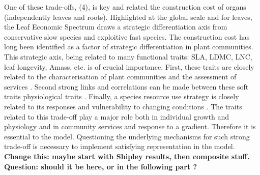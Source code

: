 One of these trade-offs, (4), is key and related the construction cost of organs (independently leaves and roots). Highlighted at the global scale and for leaves, the Leaf Economic Spectrum \cite{wright_worldwide_2004} draws a strategic differentiation axis from conservative slow species and exploitive fast species. The construction cost has long been identified as a factor of strategic differentiation in plant communities\cite{westoby_leaf-height-seed_1998}. This strategic axis, being related to many functional traits: SLA, LDMC, LNC, leaf longevity, Amass, etc.\cite{wright_worldwide_2004} is of crucial importance. First, these traits are closely related to the characterisation of plant communities and the assessment of services \cite{grime_benefits_1998}. Second strong links and correlations can be made between these soft traits physiological traits \cite{craine_functional_2002, reich_variation_2003, wright_worlwide_2004}. Finally, a species resource use strategy is closely related to its responses and vulnerability to changing conditions \cite{poorter_causes_2009, dwyer_specific_2014, deleglise_drought-induced_2015}. The traits related to this trade-off play a major role both in individual growth and physiology and in community services and response to a gradient. Therefore it is essential to the model. Questioning the underlying mechanisms for such strong trade-off is necessary to implement satisfying representation in the model.\\

\textbf{Change this: maybe start with Shipley results, then composite stuff. Question: should it be here, or in the following part ?}

